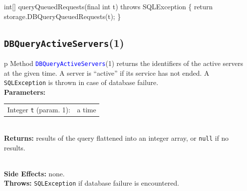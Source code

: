 \nwenddocs{}\endmoddef{}
int[] queryQueuedRequests(final int t) throws SQLException \{
  return storage.DBQueryQueuedRequests(t);
\}
\eatline
{}\nwendcode{}\nwdocspar
\subsection{\texttt{DBQueryActiveServers}(1)}
\begin{tabular}{p{\textwidth}}
\toprule
{}
Method \textcolor{blue}{{\tt{}\protect{}DBQueryActiveServers}}(1) returns the identifiers
of the active servers at the given time. A server is ``active'' if its
service has not ended.
A {\tt{}SQLException} is thrown in case of database failure.\\
\midrule
\textbf{Parameters:} \\
\begin{tabular}{lp{116mm}}
Integer {\tt{}t} (param. 1):&a time
\end{tabular}\\
\textbf{Returns:} results of the query flattened into an integer array, or
{\tt{}null} if no results.

\\
\textbf{Side Effects:} none.\\
\textbf{Throws:} {\tt{}SQLException} if database failure is encountered.\\
\bottomrule
\end{tabular}
\nwenddocs{}\endmoddef{}
